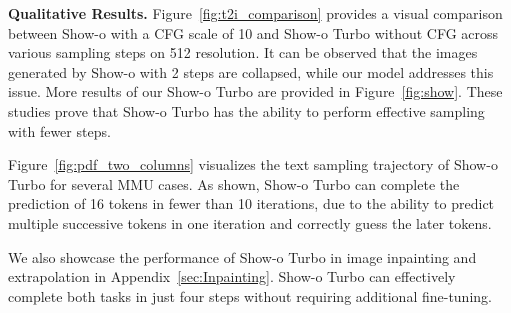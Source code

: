 \noindent \textbf{Qualitative Results.} 
Figure~\ref{fig:t2i_comparison} provides a visual comparison between Show-o with a CFG scale of 10 and Show-o Turbo without CFG across various sampling steps on 512 resolution. 
It can be observed that the images generated by Show-o with 2 steps are collapsed, while our model addresses this issue. 
More results of our Show-o Turbo are provided in Figure~\ref{fig:show}. 
These studies prove that Show-o Turbo has the ability to perform effective sampling with fewer steps. 

Figure~\ref{fig:pdf_two_columns} visualizes the text sampling trajectory of Show-o Turbo for several MMU cases.
As shown, Show-o Turbo can complete the prediction of 16 tokens in fewer than 10 iterations, due to the ability to predict multiple successive tokens in one iteration and correctly guess the later tokens. 

We also showcase the performance of Show-o Turbo in image inpainting and extrapolation in Appendix~\ref{sec:Inpainting}.
Show-o Turbo can effectively complete both tasks in just four steps without requiring additional fine-tuning.



